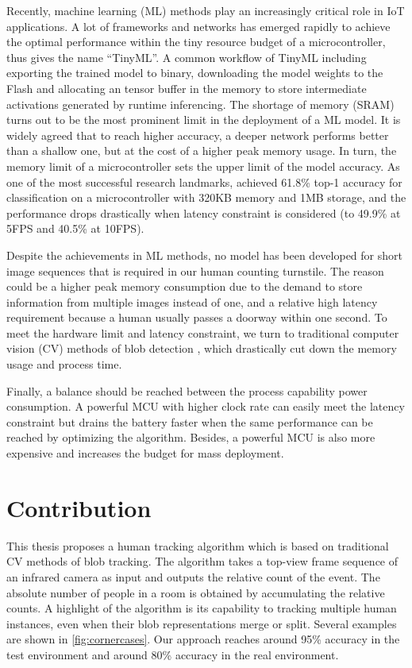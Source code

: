 Recently, machine learning (ML) methods play an increasingly critical role in IoT applications. A lot of frameworks and networks has emerged rapidly to achieve the optimal performance within the tiny resource budget of a microcontroller, thus gives the name ``TinyML''. A common workflow of TinyML including exporting the trained model to binary, downloading the model weights to the Flash and allocating an tensor buffer in the memory to store intermediate activations generated by runtime inferencing. The shortage of memory (SRAM) turns out to be the most prominent limit in the deployment of a ML model. It is widely agreed that to reach higher accuracy, a deeper network performs better than a shallow one, but at the cost of a higher peak memory usage. In turn, the memory limit of a microcontroller sets the upper limit of the model accuracy. As one of the most successful research landmarks, \citeauthor{mcunet2020lin} \cite{mcunet2020lin} achieved 61.8\% top-1 accuracy for classification on a microcontroller with 320KB memory and 1MB storage, and the performance drops drastically when latency constraint is considered (to 49.9\% at 5FPS and 40.5\% at 10FPS).

Despite the achievements in ML methods, no model has been developed for short image sequences that is required in our human counting turnstile. The reason could be a higher peak memory consumption due to the demand to store information from multiple images instead of one, and a relative high latency requirement because a human usually passes a doorway within one second. To meet the hardware limit and latency constraint, we turn to traditional computer vision (CV) methods of blob detection \cite{kaspers2011blob}, which drastically cut down the memory usage and process time.

Finally, a balance should be reached between the process capability power consumption. A powerful MCU with higher clock rate can easily meet the latency constraint but drains the battery faster when the same performance can be reached by optimizing the algorithm. Besides, a powerful MCU is also more expensive and increases the budget for mass deployment.

\section{Contribution}
This thesis proposes a human tracking algorithm which is based on traditional CV methods of blob tracking. The algorithm takes a top-view frame sequence of an infrared camera as input and outputs the relative count of the event. The absolute number of people in a room is obtained by accumulating the relative counts. A highlight of the algorithm is its capability to tracking multiple human instances, even when their blob representations merge or split. Several examples are shown in \autoref{fig:cornercases}. Our approach reaches around 95\% accuracy in the test environment and around 80\% accuracy in the real environment. 

